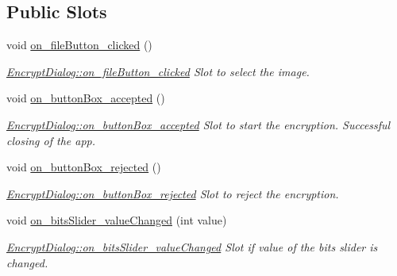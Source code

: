 \subsection*{Public Slots}
\begin{DoxyCompactItemize}
\item 
void \hyperlink{class_encrypt_dialog_ac9817d3f11f44f4bb8d97a228fbdf8a5}{on\+\_\+file\+Button\+\_\+clicked} ()
\begin{DoxyCompactList}\small\item\em \hyperlink{class_encrypt_dialog_ac9817d3f11f44f4bb8d97a228fbdf8a5}{Encrypt\+Dialog\+::on\+\_\+file\+Button\+\_\+clicked} Slot to select the image. \end{DoxyCompactList}\item 
void \hyperlink{class_encrypt_dialog_a9a998acd37db458eede31f4a9cb16b78}{on\+\_\+button\+Box\+\_\+accepted} ()
\begin{DoxyCompactList}\small\item\em \hyperlink{class_encrypt_dialog_a9a998acd37db458eede31f4a9cb16b78}{Encrypt\+Dialog\+::on\+\_\+button\+Box\+\_\+accepted} Slot to start the encryption. Successful closing of the app. \end{DoxyCompactList}\item 
void \hyperlink{class_encrypt_dialog_a43deb5fd2be501f4d03582a8ed49e9c2}{on\+\_\+button\+Box\+\_\+rejected} ()
\begin{DoxyCompactList}\small\item\em \hyperlink{class_encrypt_dialog_a43deb5fd2be501f4d03582a8ed49e9c2}{Encrypt\+Dialog\+::on\+\_\+button\+Box\+\_\+rejected} Slot to reject the encryption. \end{DoxyCompactList}\item 
void \hyperlink{class_encrypt_dialog_ae5975a58b8ed8f7e423e5d5cc5f58dce}{on\+\_\+bits\+Slider\+\_\+value\+Changed} (int value)
\begin{DoxyCompactList}\small\item\em \hyperlink{class_encrypt_dialog_ae5975a58b8ed8f7e423e5d5cc5f58dce}{Encrypt\+Dialog\+::on\+\_\+bits\+Slider\+\_\+value\+Changed} Slot if value of the bits slider is changed. \end{DoxyCompactList}\end{DoxyCompactItemize}

